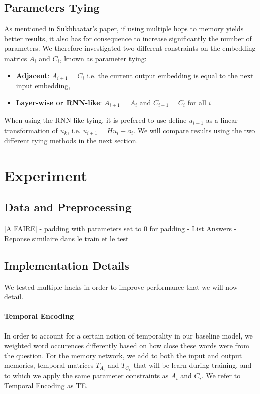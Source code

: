 \documentclass[twoside,11pt]{article}
\begin{document}
\subsection{Parameters Tying}
As mentioned in Sukhbaatar's paper, if using multiple hops to memory yields better results, it also has for consequence to increase significantly the number of parameters. We therefore investigated two different constraints on the embedding matrics $A_i$ and $C_i$, known as parameter tying:
\begin{itemize}
\item \textbf{Adjacent}: $A_{i+1} = C_i$ i.e. the current output embedding is equal to the next input embedding,
\item \textbf{Layer-wise or RNN-like}:  $A_{i+1} = A_i$ and  $C_{i+1} = C_i$ for all $i$
\end{itemize}
When using the RNN-like tying, it is prefered to use define $u_{i+1}$ as a linear transformation of $u_k$, i.e. $u_{i+1} = H u_{i} + o_{i}$. We will compare results using the two different tying methods in the next section.

\section{Experiment}
\subsection{Data and Preprocessing}
[A FAIRE]
- padding with parameters set to 0 for padding
- List Answers
- Reponse similaire dans le train et le test

\subsection{Implementation Details}
\noindent We tested multiple hacks in order to improve performance that we will now detail.
\paragraph{Temporal Encoding}
In order to account for a certain notion of temporality in our baseline model, we weighted word occurences differently based on how close these words were from the question. For the memory network, we add to both the input and output memories, temporal matrices $T_{A_i}$ and $T_{C_i}$ that will be learn during training, and to which we apply the same parameter constraints as $A_i$ and $C_i$. We refer to Temporal Encoding as TE.
 
\end{document}
